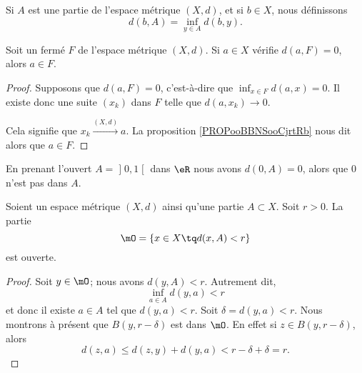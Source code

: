 \begin{definition}      \label{DEFooGNNUooFUZINs}
	Si \( A\) est une partie de l'espace métrique \( (X,d)\), et si \( b\in X\), nous définissons
	\begin{equation}
		d(b,A)=\inf_{y\in A}d(b,y).
	\end{equation}
\end{definition}


\begin{lemma}        \label{LEMooEQIZooLpsbOe}
	Soit un fermé \( F\) de l'espace métrique \( (X,d)\). Si \( a\in X\) vérifie \( d(a,F)=0\), alors \( a\in F\).
\end{lemma}

\begin{proof}
	Supposons que \( d(a,F)=0\), c'est-à-dire que \( \inf_{x\in F} d(a,x) =0\). Il existe donc une suite \( (x_k)\) dans \( F\) telle que \( d(a,x_k)\to 0\).

	Cela signifie que \( x_k\stackrel{(X,d)}{\longrightarrow}a\). La proposition \ref{PROPooBBNSooCjrtRb} nous dit alors que \( a\in F\).
\end{proof}


\begin{example}
	En prenant l'ouvert \( A=\mathopen] 0 , 1 \mathclose[\) dans \( \eR\) nous avons \( d(0,A)=0\), alors que \( 0\) n'est pas dans \( A\).
\end{example}

\begin{lemma}    \label{LEMooJNRTooZyKiFC}
	Soient un espace métrique \( (X,d)\) ainsi qu'une partie \( A\subset X\). Soit \( r>0\). La partie
	\begin{equation}
		\mO=\{ x\in X\tq d(x,A) < r\}
	\end{equation}
	est ouverte.
\end{lemma}

\begin{proof}
	Soit \( y\in \mO\); nous avons \( d(y,A)<r\). Autrement dit,
	\begin{equation}
		\inf_{a\in A}d(y,a)<r
	\end{equation}
	et donc il existe \( a\in A\) tel que \( d(y,a)<r\). Soit \( \delta=d(y,a)<r\). Nous montrons à présent que \( B(y,r-\delta)\) est dans \( \mO\). En effet si \( z\in B(y,r-\delta)\), alors
	\begin{equation}
		d(z,a)\leq d(z,y)+d(y,a)<r-\delta+\delta=r.
	\end{equation}
\end{proof}


